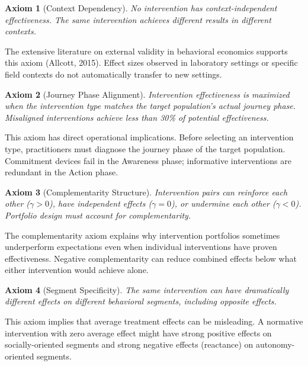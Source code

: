 \documentclass[12pt,a4paper]{article}
\newtheorem{axiom}{Axiom}
\begin{document}
\begin{axiom}[Context Dependency]
No intervention has context-independent effectiveness. The same intervention achieves different results in different contexts.
\end{axiom}

The extensive literature on external validity in behavioral economics supports this axiom (Allcott, 2015). Effect sizes observed in laboratory settings or specific field contexts do not automatically transfer to new settings.

\begin{axiom}[Journey Phase Alignment]
Intervention effectiveness is maximized when the intervention type matches the target population's actual journey phase. Misaligned interventions achieve less than 30\% of potential effectiveness.
\end{axiom}

This axiom has direct operational implications. Before selecting an intervention type, practitioners must diagnose the journey phase of the target population. Commitment devices fail in the Awareness phase; informative interventions are redundant in the Action phase.

\begin{axiom}[Complementarity Structure]
Intervention pairs can reinforce each other ($\gamma > 0$), have independent effects ($\gamma = 0$), or undermine each other ($\gamma < 0$). Portfolio design must account for complementarity.
\end{axiom}

The complementarity axiom explains why intervention portfolios sometimes underperform expectations even when individual interventions have proven effectiveness. Negative complementarity can reduce combined effects below what either intervention would achieve alone.

\begin{axiom}[Segment Specificity]
The same intervention can have dramatically different effects on different behavioral segments, including opposite effects.
\end{axiom}

This axiom implies that average treatment effects can be misleading. A normative intervention with zero average effect might have strong positive effects on socially-oriented segments and strong negative effects (reactance) on autonomy-oriented segments.


\end{document}
